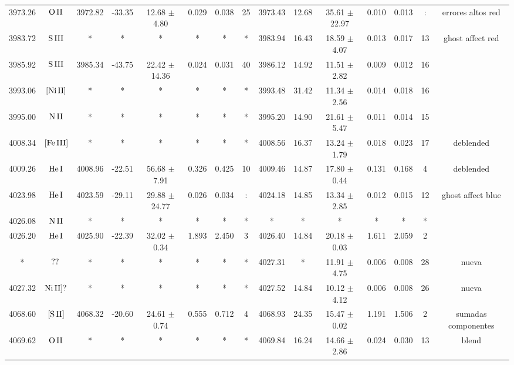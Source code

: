 \documentclass{article}
\begin{document}
\begin{table*}
\begin{adjustbox}{width=\textwidth}
\begin{tabular}{ccccccccccccccc}
3973.26 & $\mbox{O}\thinspace \mbox{II}$ & 3972.82 & -33.35 & 12.68 $\pm$ 4.80 & 0.029 & 0.038 & 25 & 3973.43 & 12.68 & 35.61 $\pm$ 22.97 & 0.010 & 0.013 & : &  errores altos red \\
3983.72 & $\mbox{S}\thinspace \mbox{III}$ & * & * & * & * & * & * & 3983.94 & 16.43 & 18.59 $\pm$ 4.07 & 0.013 & 0.017 & 13 &  ghost affect red \\
3985.92 & $\mbox{S}\thinspace \mbox{III}$ & 3985.34 & -43.75 & 22.42 $\pm$ 14.36 & 0.024 & 0.031 & 40 & 3986.12 & 14.92 & 11.51 $\pm$ 2.82 & 0.009 & 0.012 & 16 &  \\
3993.06 & $\mbox{[Ni}\thinspace \mbox{II]}$ & * & * & * & * & * & * & 3993.48 & 31.42 & 11.34 $\pm$ 2.56 & 0.014 & 0.018 & 16 &  \\
3995.00 & $\mbox{N}\thinspace \mbox{II}$ & * & * & * & * & * & * & 3995.20 & 14.90 & 21.61 $\pm$ 5.47 & 0.011 & 0.014 & 15 &  \\
4008.34 & $\mbox{[Fe}\thinspace \mbox{III]}$ & * & * & * & * & * & * & 4008.56 & 16.37 & 13.24 $\pm$ 1.79 & 0.018 & 0.023 & 17 &  deblended \\
4009.26 & $\mbox{He}\thinspace \mbox{I}$ & 4008.96 & -22.51 & 56.68 $\pm$ 7.91 & 0.326 & 0.425 & 10 & 4009.46 & 14.87 & 17.80 $\pm$ 0.44 & 0.131 & 0.168 & 4 &  deblended \\
4023.98 & $\mbox{He}\thinspace \mbox{I}$ & 4023.59 & -29.11 & 29.88 $\pm$ 24.77 & 0.026 & 0.034 & : & 4024.18 & 14.85 & 13.34 $\pm$ 2.85 & 0.012 & 0.015 & 12 &  ghost affect blue \\
4026.08 & $\mbox{N}\thinspace \mbox{II}$ & * & * & * & * & * & * & * & * & * & * & * & * &  \\
4026.20 & $\mbox{He}\thinspace \mbox{I}$ & 4025.90 & -22.39 & 32.02 $\pm$ 0.34 & 1.893 & 2.450 & 3 & 4026.40 & 14.84 & 20.18 $\pm$ 0.03 & 1.611 & 2.059 & 2 &  \\
* & $\mbox{??}\thinspace \mbox{}$ & * & * & * & * & * & * & 4027.31 & * & 11.91 $\pm$ 4.75 & 0.006 & 0.008 & 28 &  nueva \\
4027.32 & $\mbox{Ni}\thinspace \mbox{II]?}$ & * & * & * & * & * & * & 4027.52 & 14.84 & 10.12 $\pm$ 4.12 & 0.006 & 0.008 & 26 &  nueva \\
4068.60 & $\mbox{[S}\thinspace \mbox{II]}$ & 4068.32 & -20.60 & 24.61 $\pm$ 0.74 & 0.555 & 0.712 & 4 & 4068.93 & 24.35 & 15.47 $\pm$ 0.02 & 1.191 & 1.506 & 2 &  sumadas componentes \\
4069.62 & $\mbox{O}\thinspace \mbox{II}$ & * & * & * & * & * & * & 4069.84 & 16.24 & 14.66 $\pm$ 2.86 & 0.024 & 0.030 & 13 &  blend \\

\end{tabular}
\end{adjustbox}
\end{table*}
\end{document}
